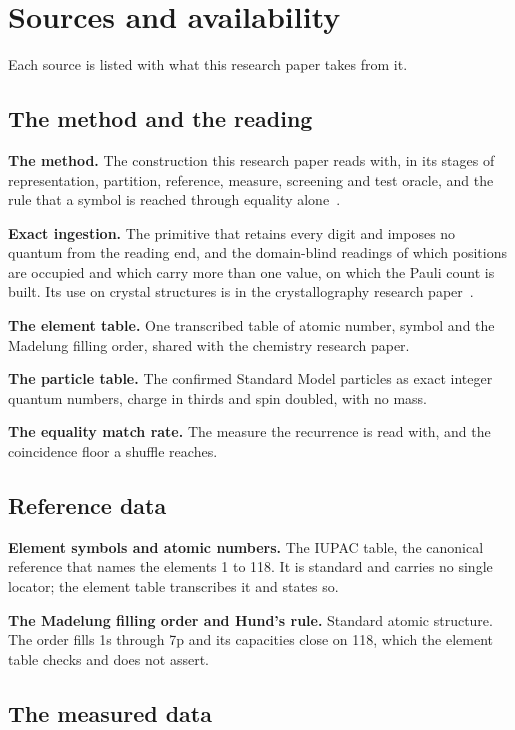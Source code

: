 \chapter{Sources and availability}

Each source is listed with what this research paper takes from it.

\section*{The method and the reading}

\textbf{The method.} The construction this research paper reads with, in its stages of
representation, partition, reference, measure, screening and test oracle, and the rule that a symbol
is reached through equality alone~\cite{src:Quigg-orior-workbook}.

\textbf{Exact ingestion.} The primitive that retains every digit and imposes no quantum from the reading
end, and the domain-blind readings of which positions are occupied and which carry more than one
value, on which the Pauli count is built. Its use on crystal structures is in the crystallography
research paper~\cite{src:Quigg-crystallography}.

\textbf{The element table.} One transcribed table of atomic number, symbol and the Madelung filling
order, shared with the chemistry research paper.

\textbf{The particle table.} The confirmed Standard Model particles as exact integer quantum numbers,
charge in thirds and spin doubled, with no mass.

\textbf{The equality match rate.} The measure the recurrence is read with, and the coincidence floor a
shuffle reaches.

\section*{Reference data}

\textbf{Element symbols and atomic numbers.} The IUPAC table, the canonical reference that names the
elements 1 to 118. It is standard and carries no single locator; the element table transcribes it and
states so.

\textbf{The Madelung filling order and Hund's rule.} Standard atomic structure. The order fills 1s
through 7p and its capacities close on 118, which the element table checks and does not assert.

\section*{The measured data}


